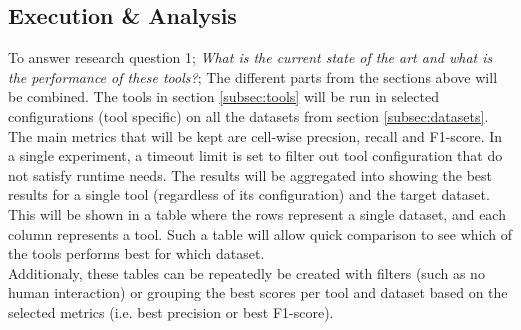\subsection{Execution \& Analysis}
To answer research question 1; \textit{What is the current state of the art and what is the performance of these tools?}; The different parts from the sections above will be combined. The tools in section \ref{subsec:tools} will be run in selected configurations (tool specific) on all the datasets from section \ref{subsec:datasets}. The main metrics that will be kept are cell-wise precsion, recall and F1-score. In a single experiment, a timeout limit is set to filter out tool configuration that do not satisfy runtime needs. The results will be aggregated into showing the best results for a single tool (regardless of its configuration) and the target dataset. This will be shown in a table where the rows represent a single dataset, and each column represents a tool. Such a table will allow quick comparison to see which of the tools performs best for which dataset.
\\Additionaly, these tables can be repeatedly be created with filters (such as no human interaction) or grouping the best scores per tool and dataset based on the selected metrics (i.e. best precision or best F1-score).